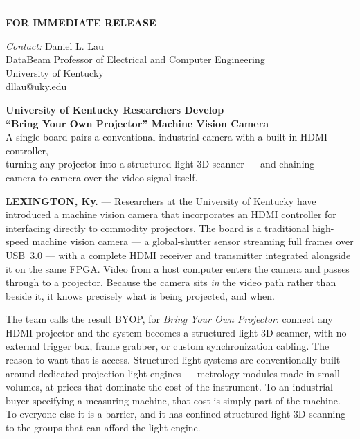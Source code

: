 \documentclass[11pt]{article}
\newcommand{\pressrule}{\textcolor{ukblue}{\rule{\linewidth}{1.2pt}}}
\begin{document}
\pagestyle{empty}

\noindent
\pressrule

\vspace{6pt}
\noindent
\begin{minipage}[t]{0.40\linewidth}
{\bfseries FOR IMMEDIATE RELEASE}
\end{minipage}\hfill
\begin{minipage}[t]{0.56\linewidth}
\raggedleft\small
\textit{Contact:} Daniel L. Lau\\
DataBeam Professor of Electrical and Computer Engineering\\
University of Kentucky\\
\href{mailto:dllau@uky.edu}{dllau@uky.edu}
\end{minipage}

\vspace{18pt}

\begin{center}
  {\LARGE\bfseries University of Kentucky Researchers Develop\\[2pt]
   ``Bring Your Own Projector'' Machine Vision Camera}\\[10pt]
  {\large A single board pairs a conventional industrial camera with a built-in
   HDMI controller,\\ turning any projector into a structured-light 3D scanner
   --- and chaining\\ camera to camera over the video signal itself.}
\end{center}

\vspace{12pt}

\noindent\textbf{LEXINGTON, Ky.} --- Researchers at the University of Kentucky
have introduced a machine vision camera that incorporates an HDMI controller for
interfacing directly to commodity projectors. The board is a traditional high-speed
machine vision camera --- a global-shutter
sensor streaming full frames over USB~3.0 --- with a complete HDMI receiver and
transmitter integrated alongside it on the same FPGA. Video from a host computer
enters the camera and passes through to a projector. Because the camera sits
\emph{in} the video path rather than beside it, it knows precisely what is being
projected, and when.

The team calls the result BYOP, for \emph{Bring Your Own Projector}: connect any
HDMI projector and the system becomes a structured-light 3D scanner, with no
external trigger box, frame grabber, or custom synchronization cabling. The reason to
want that is access. Structured-light systems are conventionally built around dedicated
projection light engines --- metrology modules made in small volumes, at prices that
dominate the cost of the instrument. To an industrial buyer specifying a measuring
machine, that cost is simply part of the machine. To everyone else it is a barrier, and
it has confined structured-light 3D scanning to the groups that can afford the light
engine.
\end{document}
